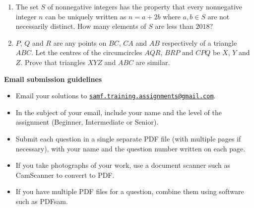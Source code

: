 \documentclass{article}
\begin{document}
\begin{enumerate}[1.]
\item %
The set $S$ of nonnegative integers has the property that every nonnegative integer $n$ can be uniquely written as $n = a+2b$ where $a,b \in S$ are not necessarily distinct. How many elements of $S$ are less than $2018$?


\item %
$P$, $Q$ and $R$ are any points on $BC$, $CA$ and $AB$ respectively of a triangle $ABC$. Let the centres of the circumcircles $AQR$, $BRP$ and $CPQ$ be $X$, $Y$ and $Z$. Prove that triangles $XYZ$ and $ABC$ are similar.


\end{enumerate}


\vfill
\textbf{\Large Email submission guidelines}
\begin{itemize}
	\item Email your solutions to \href{mailto:samf.training.assignments@gmail.com}{\texttt{samf.training.assignments@gmail.com}}.
	\item In the subject of your email, include your name and the level of the assignment (Beginner, Intermediate or Senior).
	\item Submit each question in a single separate PDF file (with multiple pages if necessary), with your name and the question number written on each page.
	\item If you take photographs of your work, use a document scanner such as CamScanner to convert to PDF.
	\item If you have multiple PDF files for a question, combine them using software such as PDFsam.
\end{itemize}
\end{document}
